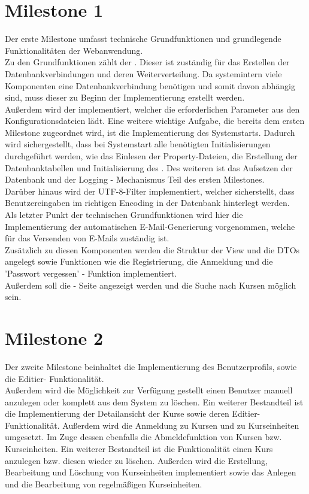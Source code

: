 \section{Milestone 1}

Der erste Milestone umfasst technische Grundfunktionen und grundlegende Funktionalitäten der Webanwendung.\\
Zu den Grundfunktionen zählt der . Dieser ist zuständig für das Erstellen der Datenbankverbindungen und deren Weiterverteilung. Da systemintern viele Komponenten eine Datenbankverbindung benötigen und somit davon abhängig sind, muss dieser zu Beginn der Implementierung erstellt werden.\\
Außerdem wird der  implementiert, welcher die erforderlichen Parameter aus den Konfigurationsdateien lädt.
Eine weitere wichtige Aufgabe, die bereits dem ersten Milestone zugeordnet wird, ist die
Implementierung des Systemstarts. Dadurch wird sichergestellt, dass bei Systemstart alle
benötigten Initialisierungen durchgeführt werden, wie das Einlesen der Property-Dateien, die Erstellung der Datenbanktabellen und Initialisierung des .
Des weiteren ist das Aufsetzen der Datenbank und der Logging - Mechanismus Teil des ersten Milestones.\\
Darüber hinaus wird der  UTF-8-Filter implementiert, welcher sicherstellt, dass Benutzereingaben
im richtigen Encoding in der Datenbank hinterlegt werden.\\
Als letzter Punkt der technischen Grundfunktionen wird hier die Implementierung der automatischen E-Mail-Generierung vorgenommen, welche für das Versenden von E-Mails zuständig ist.\\ 
Zusätzlich zu diesen Komponenten werden die Struktur der View  und die DTOs angelegt sowie Funktionen wie die Registrierung, die Anmeldung und die 'Passwort vergessen' - Funktion implementiert.\\
Außerdem soll die  - Seite angezeigt werden und die Suche nach Kursen möglich sein.\\

\section{Milestone 2}

Der zweite Milestone beinhaltet die Implementierung des Benutzerprofils, sowie die Editier-
Funktionalität.\\
Außerdem wird die Möglichkeit zur Verfügung gestellt einen Benutzer manuell anzulegen oder komplett aus dem System zu löschen.
Ein weiterer Bestandteil ist die Implementierung der Detailansicht der Kurse sowie deren Editier-Funktionalität.
Außerdem wird die Anmeldung zu Kursen und zu Kurseinheiten umgesetzt. Im Zuge dessen ebenfalls die Abmeldefunktion von Kursen bzw. Kurseinheiten.
Ein weiterer Bestandteil ist die Funktionalität einen Kurs anzulegen bzw. diesen wieder zu löschen. 
Außerden wird die Erstellung, Bearbeitung und Löschung von Kurseinheiten implementiert sowie das Anlegen und die Bearbeitung von regelmäßigen Kurseinheiten.


